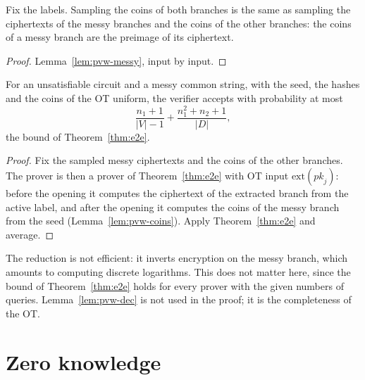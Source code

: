 \begin{lemma}
  \label{lem:pvw-coins}
  \leanok
  Fix the labels. Sampling the coins of both branches is the same as sampling the ciphertexts of
  the messy branches and the coins of the other branches: the coins of a messy branch are the
  preimage of its ciphertext.
\end{lemma}

\begin{proof}
  \leanok
  Lemma~\ref{lem:pvw-messy}, input by input.
\end{proof}

\begin{theorem}
  \label{thm:pvw-sound}
  \leanok
  For an unsatisfiable circuit and a messy common string, with the seed, the hashes and the coins
  of the OT uniform, the verifier accepts with probability at most
  \[ \frac{n_1 + 1}{|V| - 1} + \frac{n_1^2 + n_2 + 1}{|D|} , \]
  the bound of Theorem~\ref{thm:e2e}.
\end{theorem}

\begin{proof}
  \leanok
  Fix the sampled messy ciphertexts and the coins of the other branches. The prover is then a
  prover of Theorem~\ref{thm:e2e} with OT input $\mathrm{ext}(\mathit{pk}_j)$: before the opening it
  computes the ciphertext of the extracted branch from the active label, and after the opening it
  computes the coins of the messy branch from the seed (Lemma~\ref{lem:pvw-coins}). Apply
  Theorem~\ref{thm:e2e} and average.
\end{proof}

\begin{remark}
  The reduction is not efficient: it inverts encryption on the messy branch, which amounts to
  computing discrete logarithms. This does not matter here, since the bound of
  Theorem~\ref{thm:e2e} holds for every prover with the given numbers of queries. Lemma~\ref{lem:pvw-dec}
  is not used in the proof; it is the completeness of the OT.
\end{remark}

\section{Zero knowledge}

